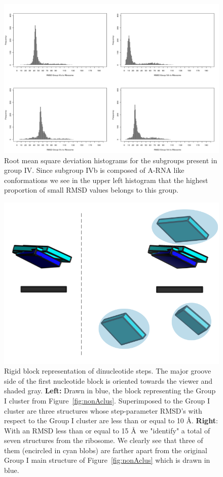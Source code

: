 \begin{figure}[htbp]
 \centering
\includegraphics[angle=90, scale=0.6]{Chapter2/RMSDschneider2.png}
\caption{Root  mean  square  deviation  histograms for  the  subgroups
  present in group  IV.  Since subgroup IVb is  composed of A-RNA like
  conformations we  see in the  upper left histogram that  the highest
  proportion of small RMSD values belongs to this group.}
 \label{fig:histo2}
\end{figure}

\begin{figure}[htp]
 \centering
\includegraphics[angle=0, scale=0.3]{Chapter2/G1at10_15.png}
\caption{Rigid block  representation of dinucleotide  steps. The major
  groove side  of the first  nucleotide block is oriented  towards the
  viewer  and shaded  gray. \textbf{Left:}  Drawn in  blue,  the block
  representing       the        Group       I       cluster       from
  Figure~\ref{fig:nonAclus}. Superimposed  to the Group  I cluster are
  three  structures whose  step-parameter RMSD's  with respect  to the
  Group I  cluster are less than  or equal to  10 \AA. \textbf{Right}:
  With an RMSD less than or equal  to 15 \AA ~we "identify" a total of
  seven structures  from the  ribosome. We clearly  see that  three of
  them (encircled in  cyan blobs) are farther apart  from the original
  Group I  main structure of Figure~\ref{fig:nonAclus}  which is drawn
  in blue.}
 \label{fig:superimpose}
\end{figure}

